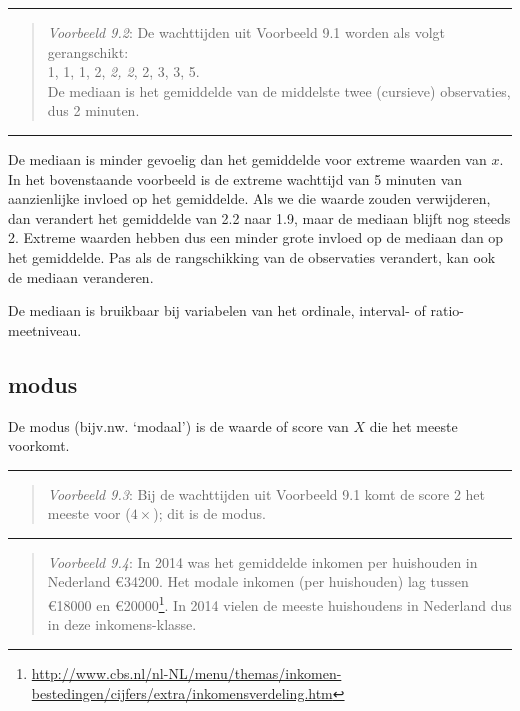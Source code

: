 \documentclass[
]{book}
\begin{document}
\begin{center}\rule{0.5\linewidth}{0.5pt}\end{center}

\begin{quote}
\emph{Voorbeeld 9.2}: De wachttijden uit Voorbeeld 9.1
worden als volgt gerangschikt:\\
1, 1, 1, 2, \emph{2, 2}, 2, 3, 3, 5.\\
De mediaan is het gemiddelde van de middelste twee (cursieve)
observaties, dus 2 minuten.
\end{quote}

\begin{center}\rule{0.5\linewidth}{0.5pt}\end{center}

De mediaan is minder gevoelig dan het gemiddelde voor extreme waarden
van \(x\). In het bovenstaande voorbeeld is de extreme wachttijd van 5
minuten van aanzienlijke invloed op het gemiddelde. Als we die waarde
zouden verwijderen, dan verandert het gemiddelde van 2.2 naar 1.9, maar
de mediaan blijft nog steeds 2. Extreme waarden hebben dus een minder
grote invloed op de mediaan dan op het gemiddelde. Pas als de
rangschikking van de observaties verandert, kan ook de mediaan
veranderen.

De mediaan is bruikbaar bij variabelen van het ordinale, interval- of
ratio-meetniveau.

\hypertarget{modus}{%
\subsection{modus}\label{modus}}

De modus (bijv.nw. `modaal') is de waarde of score van \(X\) die het
meeste voorkomt.

\begin{center}\rule{0.5\linewidth}{0.5pt}\end{center}

\begin{quote}
\emph{Voorbeeld 9.3}: Bij de wachttijden uit Voorbeeld 9.1
komt de score 2 het meeste voor
(\(4\times\)); dit is de modus.
\end{quote}

\begin{center}\rule{0.5\linewidth}{0.5pt}\end{center}

\begin{quote}
\emph{Voorbeeld 9.4}: In 2014 was het gemiddelde inkomen per huishouden in Nederland €34200.
Het modale inkomen (per huishouden) lag tussen €18000 en €20000\footnote{\url{http://www.cbs.nl/nl-NL/menu/themas/inkomen-bestedingen/cijfers/extra/inkomensverdeling.htm}}. In
2014 vielen de meeste huishoudens in Nederland dus in deze inkomens-klasse.
\end{quote}
\end{document}
